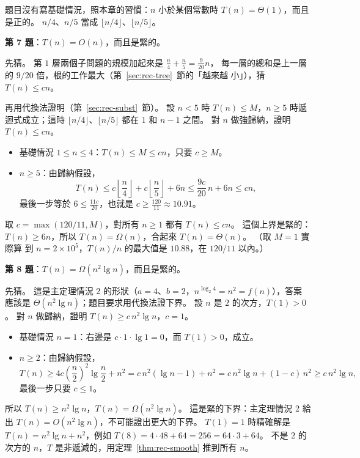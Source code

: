 題目沒有寫基礎情況，照本章的習慣：$n$ 小於某個常數時 $T(n) = \Theta(1)$，而且是正的。
$n/4$、$n/5$ 當成 $\lfloor n/4 \rfloor$、$\lfloor n/5 \rfloor$。

\textbf{第 7 題}：$T(n) = O(n)$，而且是緊的。

先猜。 第 $1$ 層兩個子問題的規模加起來是 $\frac{n}{4} + \frac{n}{5} = \frac{9}{20}n$，
每一層的總和是上一層的 $9/20$ 倍，根的工作最大（第~\ref{sec:rec-tree}~節的「越來越
小」），猜 $T(n) \le cn$。

再用代換法證明（第~\ref{sec:rec-subst}~節）。 設 $n < 5$ 時 $T(n) \le M$，$n \ge 5$
時遞迴式成立；這時 $\lfloor n/4 \rfloor$、$\lfloor n/5 \rfloor$ 都在 $1$ 和 $n - 1$
之間。 對 $n$ 做強歸納，證明 $T(n) \le cn$。
\begin{itemize}
\item 基礎情況 $1 \le n \le 4$：$T(n) \le M \le cn$，只要 $c \ge M$。
\item $n \ge 5$：由歸納假設，
\[
T(n) \le c \left\lfloor \frac{n}{4} \right\rfloor + c \left\lfloor \frac{n}{5} \right\rfloor
+ 6n \le \frac{9c}{20}\, n + 6n \le cn ,
\]
最後一步等於 $6 \le \frac{11c}{20}$，也就是 $c \ge \frac{120}{11} \approx 10.91$。
\end{itemize}
取 $c = \max(120/11, M)$，對所有 $n \ge 1$ 都有 $T(n) \le cn$。 這個上界是緊的：
$T(n) \ge 6n$，所以 $T(n) = \Omega(n)$，合起來 $T(n) = \Theta(n)$。 （取 $M = 1$ 實際算
到 $n = 2 \times 10^5$，$T(n)/n$ 的最大值是 $10.88$，在 $120/11$ 以內。）

\textbf{第 8 題}：$T(n) = \Omega(n^2 \lg n)$，而且是緊的。

先猜。 這是主定理情況 2 的形狀（$a = 4$、$b = 2$，$n^{\log_2 4} = n^2 = f(n)$），答案
應該是 $\Theta(n^2 \lg n)$；題目要求用代換法證下界。 設 $n$ 是 $2$ 的次方，$T(1) > 0$。
對 $n$ 做歸納，證明 $T(n) \ge c\, n^2 \lg n$，$c = 1$。
\begin{itemize}
\item 基礎情況 $n = 1$：右邊是 $c \cdot 1 \cdot \lg 1 = 0$，而 $T(1) > 0$，成立。
\item $n \ge 2$：由歸納假設，
\[
T(n) \ge 4c \left(\frac{n}{2}\right)^2 \lg \frac{n}{2} + n^2
= c\, n^2 (\lg n - 1) + n^2 = c\, n^2 \lg n + (1 - c)\, n^2 \ge c\, n^2 \lg n ,
\]
最後一步只要 $c \le 1$。
\end{itemize}
所以 $T(n) \ge n^2 \lg n$，$T(n) = \Omega(n^2 \lg n)$。 這是緊的下界：主定理情況 2 給
出 $T(n) = O(n^2 \lg n)$，不可能證出更大的下界。 $T(1) = 1$ 時精確解是
$T(n) = n^2 \lg n + n^2$，例如 $T(8) = 4 \cdot 48 + 64 = 256 = 64 \cdot 3 + 64$。 不是
$2$ 的次方的 $n$，$T$ 是非遞減的，用定理~\ref{thm:rec-smooth} 推到所有 $n$。

